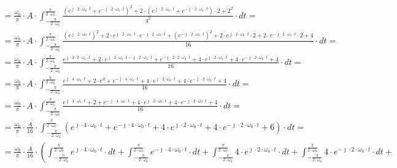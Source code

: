 \begin{task}
\begin{align*}
&=\frac{\omega_0}{\pi} \cdot A \cdot \int_{-\frac{\pi}{2\cdot\omega_0}}^{\frac{\pi}{2\cdot\omega_0}} \frac{\left(e^{\jmath \cdot 2 \cdot \omega_0 \cdot t}+e^{-\jmath \cdot 2 \cdot \omega_0 \cdot t}\right)^2+2\cdot \left(e^{\jmath \cdot 2 \cdot \omega_0 \cdot t}+e^{-\jmath \cdot 2 \cdot \omega_0 \cdot t}\right) \cdot 2 + 2^2}{4^2} \cdot dt=\\
&=\frac{\omega_0}{\pi} \cdot A \cdot \int_{-\frac{\pi}{2\cdot\omega_0}}^{\frac{\pi}{2\cdot\omega_0}} \frac{\left(e^{\jmath \cdot 2 \cdot \omega_0 \cdot t}\right)^2+2\cdot e^{\jmath \cdot 2 \cdot \omega_0 \cdot t}\cdot e^{-\jmath \cdot 2 \cdot \omega_0 \cdot t} +\left(e^{-\jmath \cdot 2 \cdot \omega_0 \cdot t}\right)^2+2\cdot e^{\jmath \cdot 2 \cdot \omega_0 \cdot t}\cdot 2 +2\cdot e^{-\jmath \cdot 2 \cdot \omega_0 \cdot t} \cdot 2 + 4}{16} \cdot dt=\\
&=\frac{\omega_0}{\pi} \cdot A \cdot \int_{-\frac{\pi}{2\cdot\omega_0}}^{\frac{\pi}{2\cdot\omega_0}} \frac{e^{\jmath \cdot 2 \cdot 2 \cdot \omega_0 \cdot t}+2\cdot e^{\jmath \cdot 2 \cdot \omega_0 \cdot t -\jmath \cdot 2 \cdot \omega_0 \cdot t} +e^{-\jmath \cdot 2 \cdot 2 \cdot \omega_0 \cdot t} +4\cdot e^{\jmath \cdot 2 \cdot \omega_0 \cdot t} +4\cdot e^{-\jmath \cdot 2 \cdot \omega_0 \cdot t} + 4}{16} \cdot dt=\\
&=\frac{\omega_0}{\pi} \cdot A \cdot \int_{-\frac{\pi}{2\cdot\omega_0}}^{\frac{\pi}{2\cdot\omega_0}} \frac{e^{\jmath \cdot 4 \cdot \omega_0 \cdot t}+2\cdot e^{0} +e^{-\jmath \cdot 4 \cdot \omega_0 \cdot t} +4\cdot e^{\jmath \cdot 2 \cdot \omega_0 \cdot t} +4\cdot e^{-\jmath \cdot 2 \cdot \omega_0 \cdot t} + 4}{16} \cdot dt=\\
&=\frac{\omega_0}{\pi} \cdot A \cdot \int_{-\frac{\pi}{2\cdot\omega_0}}^{\frac{\pi}{2\cdot\omega_0}} \frac{e^{\jmath \cdot 4 \cdot \omega_0 \cdot t}+2 +e^{-\jmath \cdot 4 \cdot \omega_0 \cdot t} +4\cdot e^{\jmath \cdot 2 \cdot \omega_0 \cdot t} +4\cdot e^{-\jmath \cdot 2 \cdot \omega_0 \cdot t} + 4}{16} \cdot dt=\\
&=\frac{\omega_0}{\pi} \cdot \frac{A}{16} \cdot \int_{-\frac{\pi}{2\cdot\omega_0}}^{\frac{\pi}{2\cdot\omega_0}} \left( e^{\jmath \cdot 4 \cdot \omega_0 \cdot t}+e^{-\jmath \cdot 4 \cdot \omega_0 \cdot t} +4\cdot e^{\jmath \cdot 2 \cdot \omega_0 \cdot t} +4\cdot e^{-\jmath \cdot 2 \cdot \omega_0 \cdot t} + 6\right)\cdot dt=\\
&=\frac{\omega_0}{\pi} \cdot \frac{A}{16} \cdot \left( \int_{-\frac{\pi}{2\cdot\omega_0}}^{\frac{\pi}{2\cdot\omega_0}} e^{\jmath \cdot 4 \cdot \omega_0 \cdot t}\cdot dt +\int_{-\frac{\pi}{2\cdot\omega_0}}^{\frac{\pi}{2\cdot\omega_0}} e^{-\jmath \cdot 4 \cdot \omega_0 \cdot t}\cdot dt +\int_{-\frac{\pi}{2\cdot\omega_0}}^{\frac{\pi}{2\cdot\omega_0}} 4\cdot e^{\jmath \cdot 2 \cdot \omega_0 \cdot t}\cdot dt +\int_{-\frac{\pi}{2\cdot\omega_0}}^{\frac{\pi}{2\cdot\omega_0}} 4\cdot e^{-\jmath \cdot 2 \cdot \omega_0 \cdot t}\cdot dt \right.+\\

\end{align*}
\end{task}
